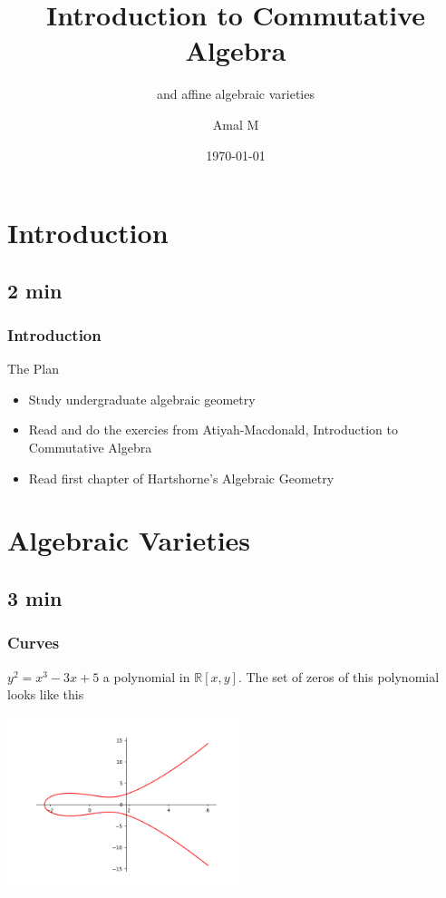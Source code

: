 \documentclass[pdf]{beamer}
\title{Introduction to Commutative Algebra}
\subtitle{and affine algebraic varieties}
\author{Amal M}
\date{\today}
\begin{document}

\begin{frame}
    \thispagestyle{empty}
    \titlepage
\end{frame}
\addtocounter{framenumber}{-1}



\section{Introduction}
\subsection{2 min}


\begin{frame}
    \frametitle{Introduction}
    The Plan
    \begin{itemize}
        \item Study undergraduate algebraic geometry 
        \item Read and do the exercies from Atiyah-Macdonald, Introduction to Commutative Algebra
        \item Read first chapter of Hartshorne's Algebraic Geometry
    \end{itemize}
\end{frame}


\section{Algebraic Varieties}
\subsection{3 min}

\begin{frame}
    \frametitle{Curves}
    $y^2 = x^3 - 3x + 5$ a polynomial in $\mathbb{R}[x,y]$. The set of zeros of this polynomial looks like this
    \begin{center}
        \includegraphics[height=2in]{ell_curv1.png}
    \end{center}
\end{frame}
\end{document}
